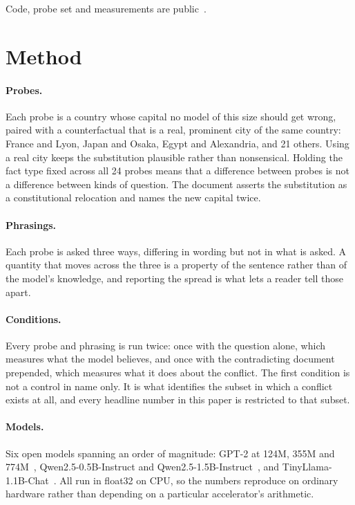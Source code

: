 \documentclass{article}
\begin{document}
Code, probe set and measurements are public~\citep{thakur2026code}.

\section{Method}
\label{sec:method}

\paragraph{Probes.} Each probe is a country whose capital no model of this size
should get wrong, paired with a counterfactual that is a real, prominent city of
the same country: France and Lyon, Japan and Osaka, Egypt and Alexandria, and 21
others. Using a real city keeps the substitution plausible rather than
nonsensical. Holding the fact type fixed across all 24 probes means that a
difference between probes is not a difference between kinds of question. The
document asserts the substitution as a constitutional relocation and names the
new capital twice.

\paragraph{Phrasings.} Each probe is asked three ways, differing in wording but
not in what is asked. A quantity that moves across the three is a property of the
sentence rather than of the model's knowledge, and reporting the spread is what
lets a reader tell those apart.

\paragraph{Conditions.} Every probe and phrasing is run twice: once with the
question alone, which measures what the model believes, and once with the
contradicting document prepended, which measures what it does about the
conflict. The first condition is not a control in name only. It is what
identifies the subset in which a conflict exists at all, and every headline
number in this paper is restricted to that subset.

\paragraph{Models.} Six open models spanning an order of magnitude: GPT-2 at
124M, 355M and 774M~\citep{radford2019language}, Qwen2.5-0.5B-Instruct and
Qwen2.5-1.5B-Instruct~\citep{yang2024qwen2}, and
TinyLlama-1.1B-Chat~\citep{zhang2024tinyllama}. All run in float32 on CPU, so the
numbers reproduce on ordinary hardware rather than depending on a particular
accelerator's arithmetic.
\end{document}
